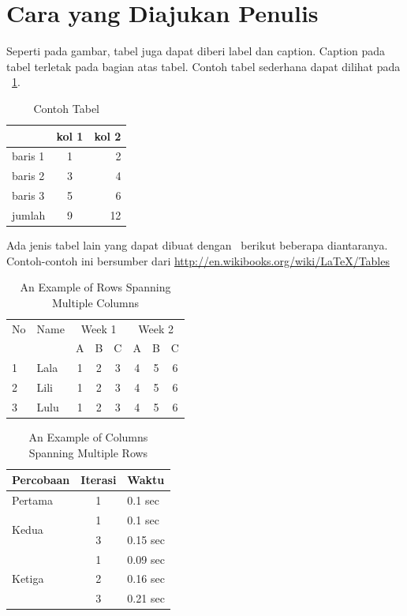 \section{Cara yang Diajukan Penulis}

Seperti pada gambar, tabel juga dapat diberi label dan caption.  Caption pada tabel terletak pada bagian atas tabel. Contoh tabel sederhana dapat dilihat pada \tab~\ref{tab:tab1}.

\begin{table}
	\centering
	\caption{Contoh Tabel}
	\label{tab:tab1}
	\begin{tabular}{| l | c r |}
		\hline
		& kol 1 & kol 2 \\ 
		\hline
		baris 1 & 1 & 2 \\
		baris 2 & 3 & 4 \\
		baris 3 & 5 & 6 \\
		jumlah  & 9 & 12 \\
		\hline
	\end{tabular}
\end{table}

Ada jenis tabel lain yang dapat dibuat dengan \latex~berikut 
beberapa diantaranya. Contoh-contoh ini bersumber dari 
\url{http://en.wikibooks.org/wiki/LaTeX/Tables}

\begin{table}
	\centering
	\caption{An Example of Rows Spanning Multiple Columns}
	\label{row.spanning}
	\begin{tabular}{|l|l|*{6}{c|}}
  		\hline %
  		No & Name & \multicolumn{3}{|c|}{Week 1} & \multicolumn{3}{|c|}{Week 2} \\
  		\cline{3-8} %
  		& & A & B & C & A & B & C\\
  		\hline
  		1 & Lala & 1 & 2 & 3 & 4 & 5 & 6\\
  		2 & Lili & 1 & 2 & 3 & 4 & 5 & 6\\
  		3 & Lulu & 1 & 2 & 3 & 4 & 5 & 6\\
  		\hline
	\end{tabular}
\end{table}

\begin{table}
	\centering
	\caption{An Example of Columns Spanning Multiple Rows}
	\label{column.spanning}
	\begin{tabular}{|l|c|l|}
		\hline
		Percobaan & Iterasi & Waktu \\
		\hline
		Pertama & 1 & 0.1 sec \\ \hline
		\multirow{2}{*}{Kedua} & 1 & 0.1 sec \\
 		& 3 & 0.15 sec \\ 
 		\hline
		\multirow{3}{*}{Ketiga} & 1 & 0.09 sec \\
 		& 2 & 0.16 sec \\
 		& 3 & 0.21 sec \\ 
 		\hline
	\end{tabular}
\end{table}

